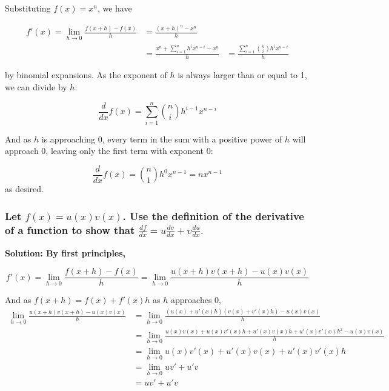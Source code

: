 \documentclass{article}
\begin{document}
Substituting $f(x) = x^n$, we have

\begin{equation*}
    \begin{aligned}
        f'(x) = \lim_{h \to 0} \frac{f(x+h)-f(x)}{h} &= \frac{(x+h)^n - x^n}{h} \\
        &= \frac{x^n + \sum_{i=1}^{n} h^i x^{n-i} - x^n}{h}
        &= \frac{\sum_{i=1}^{n} {n \choose i} h^i x^{n-i}}{h}
    \end{aligned}
\end{equation*}

by binomial expansions. As the exponent of $h$ is always larger than or equal to 1, we can divide by $h$:

\begin{equation*}
    \frac{d}{dx} f(x) = \sum_{i=1}^{n} {n \choose i} h^{i-1} x^{n-i}
\end{equation*}

And as $h$ is approaching 0, every term in the sum with a positive power of $h$ will approach 0, leaving only the first term with exponent 0:

\begin{equation*}
    \frac{d}{dx} f(x) = {n \choose 1} h^{0} x^{n-1} = nx^{n-1}
\end{equation*}
as desired.

\hrulefill
\subsubsection*{Let $f(x) = u(x)v(x)$. Use the definition of the derivative of a function to show that $\frac{df}{dx}=u \frac{dv}{dx} + v\frac{du}{dx}.$}
\bf{Solution: }\normalfont By first principles,

\begin{equation*}
        f'(x) = \lim_{h \to 0} \frac{f(x+h)-f(x)}{h} = \lim_{h \to 0} \frac{u(x+h)v(x+h) - u(x)v(x)}{h}
\end{equation*}

And as $f(x+h) = f(x) + f'(x)h$ as $h$ approaches 0,
\begin{equation*}
    \begin{aligned}
        \lim_{h \to 0} \frac{u(x+h)v(x+h) - u(x)v(x)}{h} &= \lim_{h \to 0} \frac{(u(x)+u'(x)h)(v(x)+v'(x)h) - u(x)v(x)}{h} \\
        &= \lim_{h \to 0} \frac{u(x)v(x) + u(x)v'(x)h + u'(x)v(x)h + u'(x)v'(x)h^2 - u(x)v(x)}{h} \\
        &= \lim_{h \to 0} u(x)v'(x) + u'(x)v(x) + u'(x)v'(x)h \\
        &= \lim_{h \to 0} uv' + u'v \\
        &= uv' + u'v
    \end{aligned}
\end{equation*}
\end{document}
